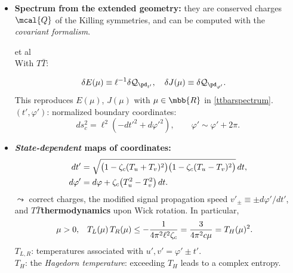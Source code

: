 \documentclass[10pt]{article}
\newcommand{\citations}[1]{{\footnotesize#1\par}}
\newcommand{\TTbar}{\texorpdfstring{\ensuremath{T\bar{T}}}{TTbar}\xspace}
\begin{document}
\begin{multicols}{3}
\begin{itemize}
\item \textbf{Spectrum from the extended geometry:} they are \mbox{conserved} charges $\mcal{Q}$ of the Killing symmetries, and can be computed with the \textit{covariant formalism}.

\citations{
	\textsl{\citeauthor{Iyer:1994ys,Barnich:2001jy}} et al\\
	With \TTbar: \textcite{Kraus:2021cwf}
}\vspace{-1.5\baselineskip}
	\begin{align*}
		\delta E(\mu) &\equiv  \ell^{-1} \delta \mathcal Q_{\pd_{t'}}, \quad \delta J(\mu) \equiv  \delta \mathcal Q_{\pd_{\varphi'}}.
	\end{align*}
	This reproduces $E(\mu)$, $J(\mu)$ with $\mu \in\mbb{R}$ in \eqref{ttbarspectrum}.\\
	$(t',\varphi')$: normalized boundary coordinates:
	\begin{equation}
		ds^2_c = \ell^2 ( -dt'^2 + d\varphi'^2) , \qquad \varphi' \sim \varphi' + 2\pi.\label{cutoffmetric}
	\end{equation}

\columnbreak

\vspace*{-8\baselineskip}

	\item \textbf{\textit{State-dependent} maps of \mbox{coordinates}:}
	\begin{align}
		dt' &= \sqrt{ \big(1 - \zeta_c (T_u+T_v)^2 \big) \big(1 - \zeta_c (T_u-T_v)^2 \big) } \, dt, \notag \\
		 d\varphi' &= d\varphi + \zeta_c \big( T_u^2 - T_v^2 \big)\,dt.
	\label{eq:state_dependent_map}
	\end{align}
	$\leadsto$ correct charges, the modified signal propagation speed $v'_{\pm} \equiv \pm {d\varphi'}/{dt'}$, and \TTbar \textbf{thermodynamics} upon Wick rotation. In particular,
	\begin{equation*}
	\hspace{-.8em} \mu > 0,\ \ \,
		T_L(\mu)\,T_R(\mu) \le - \frac{1}{4\pi^2 \ell^2 \zeta_c} = \frac{3}{4\pi^2c\mu} = T_H(\mu)^2.
	\end{equation*}
	$T_{L,R}$: temperatures associated with $u',v' = \varphi' \pm t'$.\\
	$T_H$: the \textit{Hagedorn temperature}: exceeding $T_H$ leads to a complex entropy.

\begin{flushright}
\vspace{-.5\baselineskip}
\citations{
\textcite{Giveon:2017nie}\\
\textcite{Apolo:2019zai}
}
\vspace{-.8\baselineskip}
\end{flushright}


\end{itemize}
\end{multicols}
\end{document}
